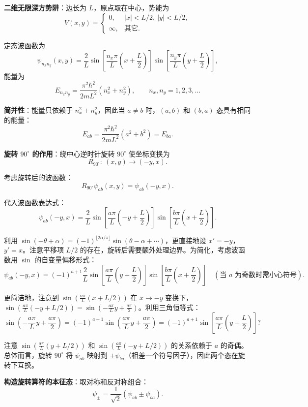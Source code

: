 \begin{solution}
	\textbf{二维无限深方势阱}：边长为 $L$，原点取在中心，势能为
	\[
	V(x,y) = \begin{cases}
	0, & |x|<L/2,\ |y|<L/2,\\
	\infty, & \text{其它}.
	\end{cases}
	\]

	定态波函数为
	\[
	\psi_{n_x n_y}(x,y) = \frac{2}{L}\sin\!\left[\frac{n_x\pi}{L}\left(x+\frac{L}{2}\right)\right]
	\sin\!\left[\frac{n_y\pi}{L}\left(y+\frac{L}{2}\right)\right],
	\]
	能量为
	\[
	E_{n_x n_y} = \frac{\pi^2\hbar^2}{2mL^2}(n_x^2+n_y^2),\qquad n_x,n_y=1,2,3,\ldots
	\]

	\textbf{简并性}：能量只依赖于 $n_x^2+n_y^2$，因此当 $a\neq b$ 时，$(a,b)$ 和 $(b,a)$ 态具有相同的能量：
	\[
	E_{ab} = \frac{\pi^2\hbar^2}{2mL^2}(a^2+b^2) = E_{ba}.
	\]

	\textbf{旋转 $90^\circ$ 的作用}：绕中心逆时针旋转 $90^\circ$ 使坐标变换为
	\[
	R_{90^\circ}:\ (x,y) \longrightarrow (-y,x).
	\]

	考虑旋转后的波函数：
	\[
	R_{90^\circ}\psi_{ab}(x,y) = \psi_{ab}(-y,x).
	\]

	代入波函数表达式：
	\[
	\psi_{ab}(-y,x)=\frac{2}{L}\sin\!\left[\frac{a\pi}{L}\left(-y+\frac{L}{2}\right)\right]
	\sin\!\left[\frac{b\pi}{L}\left(x+\frac{L}{2}\right)\right].
	\]

	利用 $\sin(-\theta+\alpha) = (-1)^{\lfloor 2\alpha/\pi\rfloor}\sin(\theta-\alpha+\cdots)$，更直接地设 $x'=-y$，$y'=x$。注意平移项 $L/2$ 的存在，旋转后需要额外处理边界。为简化，考虑波函数用 $\sin$ 的自变量偏移形式：
	\[
	\psi_{ab}(-y,x) = (-1)^{a+1}\frac{2}{L}\sin\!\left[\frac{a\pi}{L}\left(y+\frac{L}{2}\right)\right]
	\sin\!\left[\frac{b\pi}{L}\left(x+\frac{L}{2}\right)\right] \quad (\text{当 } a\text{ 为奇数时需小心符号}).
	\]

	更简洁地，注意到 $\sin(\frac{n\pi}{L}(x+L/2))$ 在 $x\to -y$ 变换下，$\sin(\frac{a\pi}{L}(-y+L/2)) = \sin(-\frac{a\pi}{L}y+\frac{a\pi}{2})$。利用三角恒等式：
	\[
	\sin\!\left(-\frac{a\pi}{L}y+\frac{a\pi}{2}\right) = (-1)^{a+1}\sin\!\left(\frac{a\pi}{L}y+\frac{a\pi}{2}\right) = (-1)^{a+1}\sin\!\left[\frac{a\pi}{L}\left(y+\frac{L}{2}\right)\right]?
	\]

	注意 $\sin(\frac{a\pi}{L}(y+L/2))$ 和 $\sin(\frac{a\pi}{L}(-y+L/2))$ 的关系依赖于 $a$ 的奇偶。总体而言，旋转 $90^\circ$ 将 $\psi_{ab}$ 映射到 $\pm\psi_{ba}$（相差一个符号因子），因此两个态在旋转下互换。

	\textbf{构造旋转算符的本征态}：取对称和反对称组合：
	\[
	\psi_\pm = \frac{1}{\sqrt{2}}(\psi_{ab}\pm\psi_{ba}).
	\]


\end{solution}
